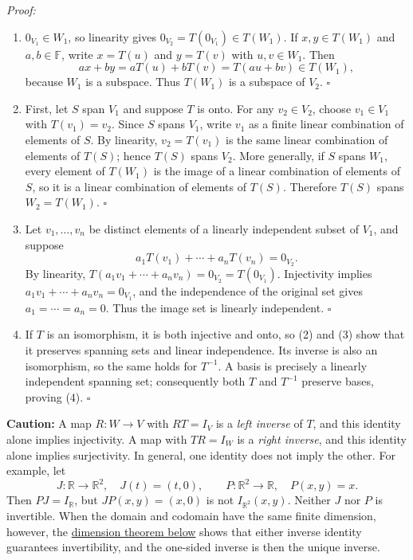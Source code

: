 \documentclass[a4paper,11pt,abstract=true]{scrartcl}
\theoremstyle{dotlessP}
\theoremstyle{dotlessS}
\theoremstyle{remark}
\theoremstyle{definition}
\begin{document}
\begin{claim_box}
\textit{Proof:}
\begin{enumerate}
\item $0_{V_1}\in W_1$, so linearity gives
$0_{V_2}=T(0_{V_1})\in T(W_1)$. If $x,y\in T(W_1)$ and
$a,b\in\mathbb{F}$, write $x=T(u)$ and $y=T(v)$ with $u,v\in W_1$.
Then
\[
ax+by=aT(u)+bT(v)=T(au+bv)\in T(W_1),
\]
because $W_1$ is a subspace. Thus $T(W_1)$ is a subspace of $V_2$.
\hfill$\square$
\item First, let $S$ span $V_1$ and suppose $T$ is onto. For any
$v_2\in V_2$, choose $v_1\in V_1$ with $T(v_1)=v_2$. Since $S$
spans $V_1$, write $v_1$ as a finite linear combination of elements
of $S$. By linearity, $v_2=T(v_1)$ is the same linear combination
of elements of $T(S)$; hence $T(S)$ spans $V_2$. More generally, if
$S$ spans $W_1$, every element of $T(W_1)$ is the image of a linear
combination of elements of $S$, so it is a linear combination of
elements of $T(S)$. Therefore $T(S)$ spans $W_2=T(W_1)$.
\hfill$\square$
\item Let $v_1,\ldots,v_n$ be distinct elements of a linearly
independent subset of $V_1$, and suppose
\[
a_1T(v_1)+\cdots+a_nT(v_n)=0_{V_2}.
\]
By linearity, $T(a_1v_1+\cdots+a_nv_n)=0_{V_2}=T(0_{V_1})$.
Injectivity implies $a_1v_1+\cdots+a_nv_n=0_{V_1}$, and the
independence of the original set gives $a_1=\cdots=a_n=0$.
Thus the image set is linearly independent.
\hfill$\square$
\item If $T$ is an isomorphism, it is both injective and onto, so
(2) and (3) show that it preserves spanning sets and linear independence.
Its inverse is also an isomorphism, so the same holds for $T^{-1}$.
A basis is precisely a linearly independent spanning set; consequently
both $T$ and $T^{-1}$ preserve bases, proving (4).
\hfill$\square$
\end{enumerate} 
\end{claim_box}

\begin{remark_box}
\textbf{Caution:} A map $R:W\longrightarrow V$
with $RT=I_V$ is a \emph{left inverse} of $T$, and this identity alone
implies injectivity. A map with $TR=I_W$ is a \emph{right inverse},
and this identity alone implies surjectivity. In general, one identity
does not imply the other. For example, let
\[
J:\mathbb{R}\longrightarrow\mathbb{R}^2,\quad J(t)=(t,0),
\qquad P:\mathbb{R}^2\longrightarrow\mathbb{R},\quad P(x,y)=x.
\]
Then $PJ=I_{\mathbb{R}}$, but $JP(x,y)=(x,0)$ is not
$I_{\mathbb{R}^2}(x,y)$. Neither $J$ nor $P$ is invertible.
When the domain and codomain have the same finite dimension, however,
the \hyperref[thm:dimension-criteria]{dimension theorem below} shows that
either inverse identity guarantees
invertibility, and the one-sided inverse is then the unique inverse.
\end{remark_box}
\end{document}
